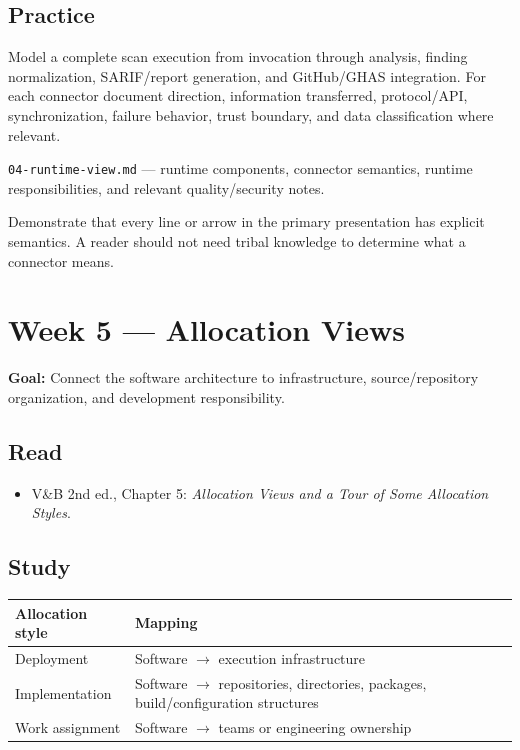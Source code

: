 \documentclass[10pt,letterpaper]{article}
\begin{document}
\subsection{Practice}
Model a complete scan execution from invocation through analysis, finding normalization, SARIF/report generation, and GitHub/GHAS integration. For each connector document direction, information transferred, protocol/API, synchronization, failure behavior, trust boundary, and data classification where relevant.

\begin{deliverablebox}
\texttt{04-runtime-view.md} --- runtime components, connector semantics, runtime responsibilities, and relevant quality/security notes.
\end{deliverablebox}

\begin{masterybox}
Demonstrate that every line or arrow in the primary presentation has explicit semantics. A reader should not need tribal knowledge to determine what a connector means.
\end{masterybox}

\section{Week 5 --- Allocation Views}

\textbf{Goal:} Connect the software architecture to infrastructure, source/repository organization, and development responsibility.

\subsection{Read}
\begin{itemize}
  \item V\&B 2nd ed., Chapter 5: \emph{Allocation Views and a Tour of Some Allocation Styles}.
\end{itemize}

\subsection{Study}
\begin{tabularx}{\textwidth}{@{}P{0.28\textwidth}Y@{}}
\toprule
{}\textbf{Allocation style} & \textbf{Mapping} \\
\midrule
Deployment & Software $\rightarrow$ execution infrastructure \\
Implementation & Software $\rightarrow$ repositories, directories, packages, build/configuration structures \\
Work assignment & Software $\rightarrow$ teams or engineering ownership \\
\bottomrule
\end{tabularx}
\end{document}
